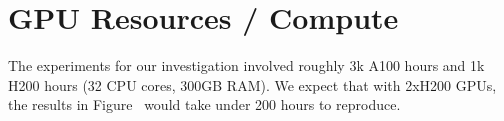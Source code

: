 \section{GPU Resources / Compute}
\label{app:gpus}

The experiments for our investigation involved roughly 3k A100 hours and 1k H200 hours (32 CPU cores, 300GB RAM). We expect that with 2xH200 GPUs, the results in Figure~\claude{\ref{fig:multitask_fig4}} would take under 200 hours to reproduce.



